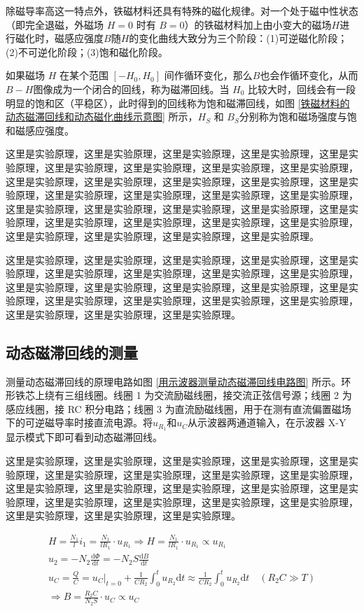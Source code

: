 \documentclass[UTF8]{article}
\theoremstyle{MyLineTheoremStyle} %
\theoremstyle{MyBlockTheoremStyle} %
\theoremstyle{MySubsubsectionStyle} %
\begin{document}
除磁导率高这一特点外，铁磁材料还具有特殊的磁化规律。对一个处于磁中性状态（即完全退磁，外磁场 $H=0$ 时有 $B = 0$）的铁磁材料加上由小变大的磁场$ H $进行磁化时，磁感应强度$ B $随$ H $的变化曲线大致分为三个阶段：(1)可逆磁化阶段；(2)不可逆化阶段；(3)饱和磁化阶段。

如果磁场 $H$ 在某个范围 $ [-H_0,H_0] $ 间作循环变化，那么$ B $也会作循环变化，从而$ B-H $图像成为一个闭合的回线，称为磁滞回线。当 $H_0$ 比较大时，回线会有一段明显的饱和区（平稳区），此时得到的回线称为饱和磁滞回线，如图 \ref{铁磁材料的动态磁滞回线和动态磁化曲线示意图} 所示，$ H_S$ 和 $B_S $分别称为饱和磁场强度与饱和磁感应强度。

这里是实验原理，这里是实验原理，这里是实验原理，这里是实验原理，这里是实验原理，这里是实验原理，这里是实验原理，这里是实验原理，这里是实验原理，这里是实验原理，这里是实验原理，这里是实验原理，这里是实验原理，这里是实验原理，这里是实验原理，这里是实验原理，这里是实验原理，这里是实验原理，这里是实验原理，这里是实验原理，这里是实验原理，这里是实验原理，这里是实验原理，这里是实验原理，这里是实验原理，这里是实验原理，这里是实验原理，这里是实验原理，这里是实验原理，这里是实验原理，这里是实验原理。


这里是实验原理，这里是实验原理，这里是实验原理，这里是实验原理，这里是实验原理，这里是实验原理，这里是实验原理，这里是实验原理，这里是实验原理，这里是实验原理，这里是实验原理，这里是实验原理，这里是实验原理，这里是实验原理，这里是实验原理，这里是实验原理，这里是实验原理，这里是实验原理，这里是实验原理，这里是实验原理，这里是实验原理。


\subsection{动态磁滞回线的测量}
测量动态磁滞回线的原理电路如图 \ref{用示波器测量动态磁滞回线电路图} 所示。环形铁芯上绕有三组线圈。线圈 1 为交流励磁线圈，接交流正弦信号源；线圈 2 为感应线圈，接 RC 积分电路；线圈 3 为直流励磁线圈，用于在测有直流偏置磁场下的可逆磁导率时接直流电源。将$ u_{R_1} $和$ u_C $从示波器两通道输入，在示波器 X-Y 显示模式下即可看到动态磁滞回线。

这里是实验原理，这里是实验原理，这里是实验原理，这里是实验原理，这里是实验原理，这里是实验原理，这里是实验原理，这里是实验原理，这里是实验原理，这里是实验原理，这里是实验原理，这里是实验原理，这里是实验原理，这里是实验原理，这里是实验原理，这里是实验原理，这里是实验原理，这里是实验原理，这里是实验原理，这里是实验原理，这里是实验原理。

\begin{gather}
H = \frac{N_1}{l}i_1 = \frac{N_1}{lR_1}\cdot u_{R_1} \Longrightarrow \boxed{
    H = \frac{N_1}{lR_1}\cdot u_{R_1} \propto u_{R_1}
} 
\\ 
u_2 = - N_2 \frac{\mathrm{d} \Phi }{\mathrm{d} t } = - N_2S \frac{\mathrm{d} B }{\mathrm{d} t } 
\\ 
u_C = \frac{Q}{C} = u_C|_{t = 0} + \frac{1}{CR_2} \int_{0}^{t} u_{R_2}\mathrm{d}t \approx \frac{1}{CR_2} \int_{0}^{t} u_{R_2}\mathrm{d}t \quad  (R_2 C \gg T) 
\\
\Longrightarrow \boxed{
    B = \frac{R_2 C}{N_2 S}\cdot u_C \propto u_C
}
\end{gather}
\end{document}
